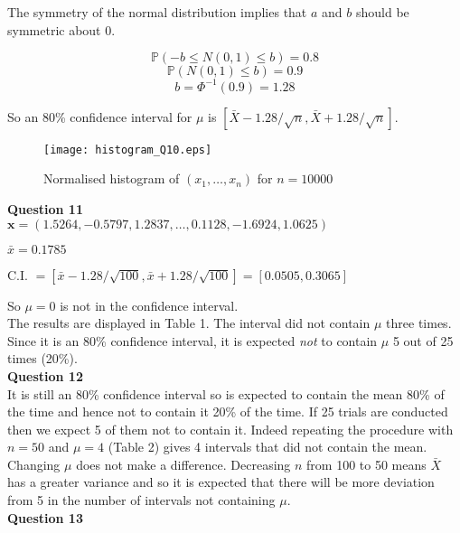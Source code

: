 \documentclass[12pt]{extarticle}
\begin{document}
The symmetry of the normal distribution implies that $a$ and $b$ should be symmetric about 0.

$$\mathbb{P}(-b \leq N(0,1) \leq b) = 0.8$$ 
$$\mathbb{P}(N(0,1) \leq b) = 0.9$$
$$b = \Phi^{-1}(0.9) = 1.28$$  

So an 80\% confidence interval for $\mu$ is $\left[\bar{X}-1.28/\sqrt{n},\bar{X}+1.28/\sqrt{n}\right]$.\\

\begin{figure}[htp!]
\centering
\texttt{[image: histogram\_Q10.eps]}\\
\caption{Normalised histogram of $(x_1, \ldots, x_n)$ for $n = 10000$ }
\label{figure:6}
\end{figure} 

\textbf{Question 11}\\

$\textbf{x} = (1.5264,
   -0.5797,
    1.2837,
    \ldots,
    0.1128,
   -1.6924,
    1.0625)$

$\bar{x} = 0.1785 $

C.I. $= \left[\bar{x}-1.28/\sqrt{100},\bar{x}+1.28/\sqrt{100}\right] = [0.0505,0.3065]$

So $\mu = 0$ is not in the confidence interval. \\

The results are displayed in Table 1. The interval did not contain $\mu$ three times. Since it is an 80\% confidence interval, it is expected \textit{not} to contain $\mu$ 5 out of 25 times (20\%).\\
 
\textbf{Question 12}\\

It is still an 80\% confidence interval so is expected to contain the mean 80\% of the time and hence not to contain it 20\% of the time. If 25 trials are conducted then we expect 5 of them not to contain it. Indeed repeating the procedure with $n =50$ and $\mu = 4$ (Table 2) gives 4 intervals that did not contain the mean. Changing $\mu$ does not make a difference. Decreasing $n$ from 100 to 50 means $\bar{X}$ has a greater variance and so it is expected that there will be more deviation from 5 in the number of intervals not containing $\mu$.\\

\textbf{Question 13}\\
\end{document}

